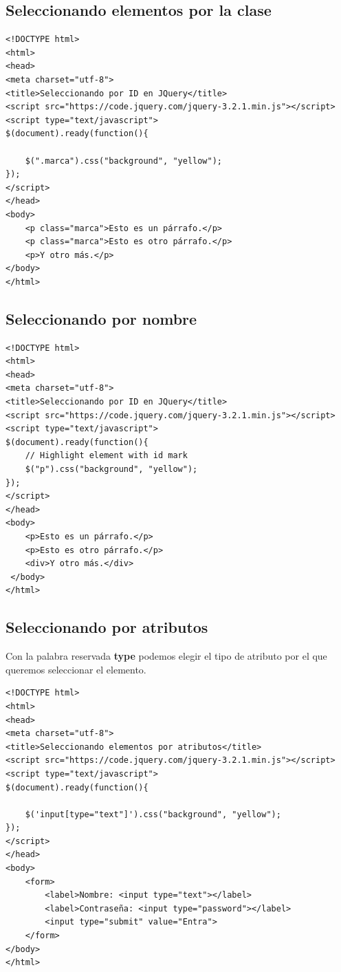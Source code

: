 \documentclass[11pt]{article}
\begin{document}
\subsection*{Seleccionando elementos por la clase}
\label{sec:orgf601f9e}

\begin{verbatim}
<!DOCTYPE html>
<html>
<head>
<meta charset="utf-8">
<title>Seleccionando por ID en JQuery</title>
<script src="https://code.jquery.com/jquery-3.2.1.min.js"></script>
<script type="text/javascript">
$(document).ready(function(){

    $(".marca").css("background", "yellow");
});
</script> 
</head>
<body>
    <p class="marca">Esto es un párrafo.</p>
    <p class="marca">Esto es otro párrafo.</p>
    <p>Y otro más.</p>
</body>
</html>                                		
\end{verbatim}

\subsection*{Seleccionando por nombre}
\label{sec:org0def737}

\begin{verbatim}
<!DOCTYPE html>
<html>
<head>
<meta charset="utf-8">
<title>Seleccionando por ID en JQuery</title>
<script src="https://code.jquery.com/jquery-3.2.1.min.js"></script>
<script type="text/javascript">
$(document).ready(function(){
    // Highlight element with id mark
    $("p").css("background", "yellow");
});
</script> 
</head>
<body>
    <p>Esto es un párrafo.</p>
    <p>Esto es otro párrafo.</p>
    <div>Y otro más.</div>
 </body>
</html>                                		
\end{verbatim}

\subsection*{Seleccionando por atributos}
\label{sec:org7f28126}

Con la palabra reservada \textbf{type} podemos elegir el tipo de atributo por el que queremos seleccionar el elemento.


\begin{verbatim}
<!DOCTYPE html>
<html>
<head>
<meta charset="utf-8">
<title>Seleccionando elementos por atributos</title>
<script src="https://code.jquery.com/jquery-3.2.1.min.js"></script>
<script type="text/javascript">
$(document).ready(function(){

    $('input[type="text"]').css("background", "yellow");
});
</script>
</head>
<body>
    <form>
        <label>Nombre: <input type="text"></label>
        <label>Contraseña: <input type="password"></label>
        <input type="submit" value="Entra">
    </form>
</body>
</html>       
\end{verbatim}
\end{document}
